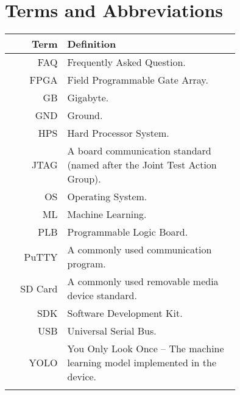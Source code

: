 \section*{Terms and Abbreviations}

\begin{tabular}[h]{rp{0.75\linewidth}}
    \hline
    \textbf{Term} & \textbf{Definition}\\
    \hline

	FAQ & Frequently Asked Question. \\
	FPGA & Field Programmable Gate Array. \\
	GB & Gigabyte. \\
	GND & Ground. \\
	HPS & Hard Processor System. \\
	JTAG & A board communication standard (named after the Joint Test Action Group).\\
	OS & Operating System. \\
	ML & Machine Learning. \\
	PLB & Programmable Logic Board. \\
	PuTTY & A commonly used communication program. \\
    SD Card & A commonly used removable media device standard. \\
    SDK & Software Development Kit. \\
    USB & Universal Serial Bus. \\
    YOLO & You Only Look Once -- The machine learning model implemented in the device.\\
     & \\

    \hline

\end{tabular}
